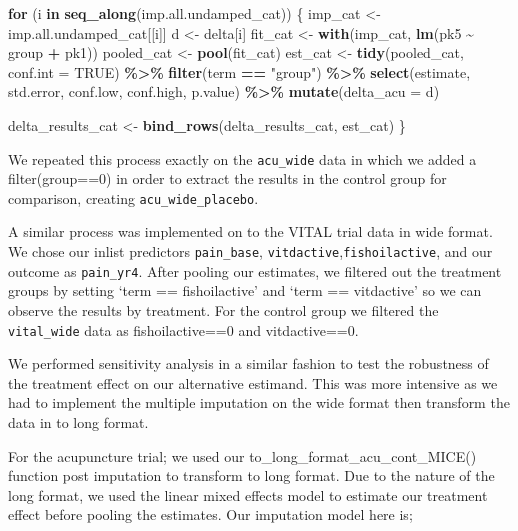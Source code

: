 \documentclass{article}
\newenvironment{Shaded}{\begin{snugshade}}{\end{snugshade}}
\newcommand{\AttributeTok}[1]{\textcolor[rgb]{0.13,0.29,0.53}{#1}}
\newcommand{\ConstantTok}[1]{\textcolor[rgb]{0.56,0.35,0.01}{#1}}
\newcommand{\ControlFlowTok}[1]{\textcolor[rgb]{0.13,0.29,0.53}{\textbf{#1}}}
\newcommand{\FunctionTok}[1]{\textcolor[rgb]{0.13,0.29,0.53}{\textbf{#1}}}
\newcommand{\NormalTok}[1]{#1}
\newcommand{\OtherTok}[1]{\textcolor[rgb]{0.56,0.35,0.01}{#1}}
\newcommand{\SpecialCharTok}[1]{\textcolor[rgb]{0.81,0.36,0.00}{\textbf{#1}}}
\newcommand{\StringTok}[1]{\textcolor[rgb]{0.31,0.60,0.02}{#1}}
\begin{document}
\begin{Shaded}
\begin{Highlighting}[]
\ControlFlowTok{for}\NormalTok{ (i }\ControlFlowTok{in} \FunctionTok{seq\_along}\NormalTok{(imp.all.undamped\_cat)) \{}
\NormalTok{  imp\_cat }\OtherTok{\textless{}{-}}\NormalTok{ imp.all.undamped\_cat[[i]]}
\NormalTok{  d }\OtherTok{\textless{}{-}}\NormalTok{ delta[i]}
\NormalTok{  fit\_cat }\OtherTok{\textless{}{-}} \FunctionTok{with}\NormalTok{(imp\_cat, }\FunctionTok{lm}\NormalTok{(pk5 }\SpecialCharTok{\textasciitilde{}}\NormalTok{ group }\SpecialCharTok{+}\NormalTok{ pk1))}
\NormalTok{  pooled\_cat }\OtherTok{\textless{}{-}} \FunctionTok{pool}\NormalTok{(fit\_cat)}
\NormalTok{  est\_cat }\OtherTok{\textless{}{-}} \FunctionTok{tidy}\NormalTok{(pooled\_cat, }\AttributeTok{conf.int =} \ConstantTok{TRUE}\NormalTok{) }\SpecialCharTok{\%\textgreater{}\%}
    \FunctionTok{filter}\NormalTok{(term }\SpecialCharTok{==} \StringTok{"group"}\NormalTok{) }\SpecialCharTok{\%\textgreater{}\%} 
    \FunctionTok{select}\NormalTok{(estimate, std.error, conf.low, conf.high, p.value) }\SpecialCharTok{\%\textgreater{}\%}
    \FunctionTok{mutate}\NormalTok{(}\AttributeTok{delta\_acu =}\NormalTok{ d)}
    
\NormalTok{  delta\_results\_cat }\OtherTok{\textless{}{-}} \FunctionTok{bind\_rows}\NormalTok{(delta\_results\_cat, est\_cat)}
\NormalTok{\}}
\end{Highlighting}
\end{Shaded}

We repeated this process exactly on the \texttt{acu\_wide} data in which
we added a filter(group==0) in order to extract the results in the
control group for comparison, creating \texttt{acu\_wide\_placebo}.

A similar process was implemented on to the VITAL trial data in wide
format. We chose our inlist predictors \texttt{pain\_base},
\texttt{vitdactive},\texttt{fishoilactive}, and our outcome as
\texttt{pain\_yr4}. After pooling our estimates, we filtered out the
treatment groups by setting `term == fishoilactive' and `term ==
vitdactive' so we can observe the results by treatment. For the control
group we filtered the \texttt{vital\_wide} data as fishoilactive==0 and
vitdactive==0.

We performed sensitivity analysis in a similar fashion to test the
robustness of the treatment effect on our alternative estimand. This was
more intensive as we had to implement the multiple imputation on the
wide format then transform the data in to long format.

For the acupuncture trial; we used our
to\_long\_format\_acu\_cont\_MICE() function post imputation to
transform to long format. Due to the nature of the long format, we used
the linear mixed effects model to estimate our treatment effect before
pooling the estimates. Our imputation model here is;
\end{document}
